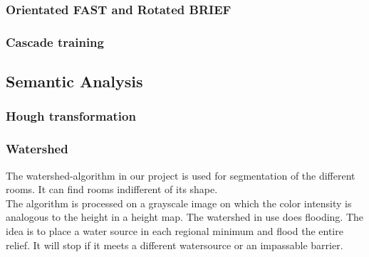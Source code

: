 \subsubsection{Orientated FAST and Rotated BRIEF}
\subsubsection{Cascade training}
\subsection{Semantic Analysis}
\subsubsection{Hough transformation}
\subsubsection{Watershed}
The watershed-algorithm in our project is used for segmentation of the different rooms. It can find rooms indifferent of its shape.
\\
The algorithm is processed on a grayscale image on which the color intensity is analogous to the height in a height map. The watershed in use does flooding. The idea is to place a water source in each regional minimum and flood the entire relief. It will stop if it meets a different watersource or an impassable barrier.
